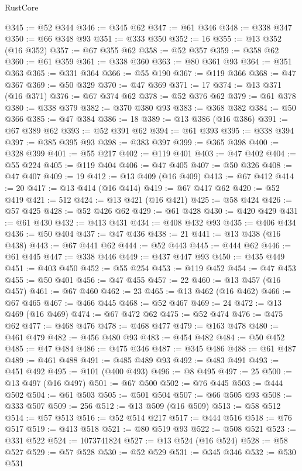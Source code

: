 \begin{lexlean}{RustCore}
\begin{coremodule}
@345 := @52 @344
@346 := @345 @62
@347 := @61 @346
@348 := @338 @347
@350 := @66 @348 @93
@351 := @333 @350
@352 := 16
@355 := @13 @352 (@16 @352)
@357 := @67 @355 @62
@358 := @52 @357
@359 := @358 @62
@360 := @61 @359
@361 := @338 @360
@363 := @80 @361 @93
@364 := @351 @363
@365 := @331 @364
@366 := @55 @190
@367 := @119 @366
@368 := @47 @367
@369 := @50 @329
@370 := @47 @369
@371 := 17
@374 := @13 @371 (@16 @371)
@376 := @67 @374 @62
@378 := @52 @376 @62
@379 := @61 @378
@380 := @338 @379
@382 := @370 @380 @93
@383 := @368 @382
@384 := @50 @366
@385 := @47 @384
@386 := 18
@389 := @13 @386 (@16 @386)
@391 := @67 @389 @62
@393 := @52 @391 @62
@394 := @61 @393
@395 := @338 @394
@397 := @385 @395 @93
@398 := @383 @397
@399 := @365 @398
@400 := @328 @399
@401 := @55 @217
@402 := @119 @401
@403 := @47 @402
@404 := @55 @224
@405 := @119 @404
@406 := @47 @405
@407 := @50 @326
@408 := @47 @407
@409 := 19
@412 := @13 @409 (@16 @409)
@413 := @67 @412
@414 := 20
@417 := @13 @414 (@16 @414)
@419 := @67 @417 @62
@420 := @52 @419
@421 := 512
@424 := @13 @421 (@16 @421)
@425 := @58 @424
@426 := @57 @425
@428 := @52 @426 @62
@429 := @61 @428
@430 := @420 @429
@431 := @61 @430
@432 := @413 @431
@434 := @408 @432 @93
@435 := @406 @434
@436 := @50 @404
@437 := @47 @436
@438 := 21
@441 := @13 @438 (@16 @438)
@443 := @67 @441 @62
@444 := @52 @443
@445 := @444 @62
@446 := @61 @445
@447 := @338 @446
@449 := @437 @447 @93
@450 := @435 @449
@451 := @403 @450
@452 := @55 @254
@453 := @119 @452
@454 := @47 @453
@455 := @50 @401
@456 := @47 @455
@457 := 22
@460 := @13 @457 (@16 @457)
@461 := @67 @460
@462 := 23
@465 := @13 @462 (@16 @462)
@466 := @67 @465
@467 := @466 @445
@468 := @52 @467
@469 := 24
@472 := @13 @469 (@16 @469)
@474 := @67 @472 @62
@475 := @52 @474
@476 := @475 @62
@477 := @468 @476
@478 := @468 @477
@479 := @163 @478
@480 := @461 @479
@482 := @456 @480 @93
@483 := @454 @482
@484 := @50 @452
@485 := @47 @484
@486 := @475 @346
@487 := @345 @486
@488 := @61 @487
@489 := @461 @488
@491 := @485 @489 @93
@492 := @483 @491
@493 := @451 @492
@495 := @101 (@400 @493)
@496 := @8 @495
@497 := 25
@500 := @13 @497 (@16 @497)
@501 := @67 @500
@502 := @76 @445
@503 := @444 @502
@504 := @61 @503
@505 := @501 @504
@507 := @66 @505 @93
@508 := @333 @507
@509 := 256
@512 := @13 @509 (@16 @509)
@513 := @58 @512
@514 := @57 @513
@516 := @52 @514 @217
@517 := @444 @516
@518 := @76 @517
@519 := @413 @518
@521 := @80 @519 @93
@522 := @508 @521
@523 := @331 @522
@524 := 1073741824
@527 := @13 @524 (@16 @524)
@528 := @58 @527
@529 := @57 @528
@530 := @52 @529
@531 := @345 @346
@532 := @530 @531

\end{coremodule}
\end{lexlean}
